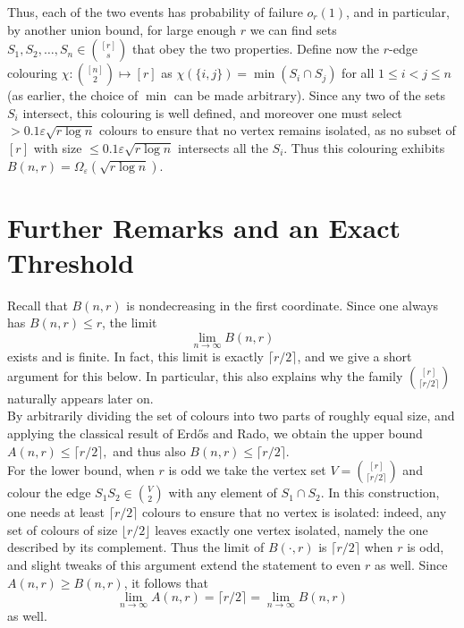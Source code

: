 \documentclass[11pt,a4paper]{article}
\begin{document}
\noindent
Thus, each of the two events has probability of failure $o_r(1)$, and in particular, by another union bound, for large enough $r$ we can find sets $S_1, S_2, \dots, S_n \in \binom{[r]}{s}$ that obey the two properties. Define now the $r$-edge colouring $\chi : \binom{[n]}{2} \mapsto [r]$ as $\chi(\{i, j\}) = \min(S_i \cap S_j)$ for all $1 \leq i < j \leq n$ (as earlier, the choice of $\min$ can be made arbitrary). Since any two of the sets $S_i$ intersect, this colouring is well defined, and moreover one must select $> 0.1\varepsilon\sqrt{r \log n}$ colours to ensure that no vertex remains isolated, as no subset of $[r]$ with size $\leq 0.1\varepsilon \sqrt{r \log n}$ intersects all the $S_i$. Thus this colouring exhibits $B(n, r) = \Omega_{\varepsilon}(\sqrt{r \log n})$.
\section{Further Remarks and an Exact Threshold}
\label{sec:4}
Recall that $B(n,r)$ is nondecreasing in the first coordinate. Since one always has $B(n,r)\leq r$, the limit
\[
\lim_{n\to\infty} B(n,r)
\]
exists and is finite. In fact, this limit is exactly $\lceil r/2\rceil$, and we give a short argument for this below. In particular, this also explains why the family $\binom{[r]}{\lceil r/2\rceil}$ naturally appears later on. \\

\noindent
By arbitrarily dividing the set of colours into two parts of roughly equal size, and applying the classical result of Erd\H{o}s and Rado, we obtain the upper bound
$
A(n,r)\leq \lceil r/2 \rceil,
$
and thus also
$
B(n,r)\leq \lceil r/2 \rceil.
$ \\

\noindent
For the lower bound, when $r$ is odd we take the vertex set $V = \binom{[r]}{\lceil r/2 \rceil}$
and colour the edge $S_1S_2 \in \binom{V}{2}$ with any element of $S_1\cap S_2$. In this construction, one needs at least $\lceil r/2 \rceil$ colours to ensure that no vertex is isolated: indeed, any set of colours of size $\lfloor r/2 \rfloor$ leaves exactly one vertex isolated, namely the one described by its complement. Thus the limit of $B(\cdot,r)$ is $\lceil r/2 \rceil$ when $r$ is odd, and slight tweaks of this argument extend the statement to even $r$ as well. Since $A(n,r)\geq B(n,r)$, it follows that
\[
\lim_{n\to\infty} A(n,r)=\lceil r/2 \rceil = \lim \limits_{n \to \infty} B(n,r)
\]
as well. \\
\end{document}
